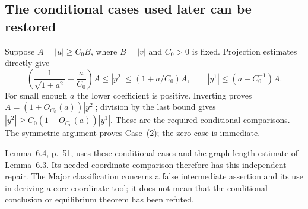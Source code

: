 \documentclass[10pt]{article}
\begin{document}
\subsection*{The conditional cases used later can be restored}
Suppose \(A=|u|\ge C_0B\), where \(B=|v|\) and \(C_0>0\) is fixed. Projection estimates directly give \[\left(\frac1{\sqrt{1+a^2}}-\frac a{C_0}\right)A
 \le |y^2|\le(1+a/C_0)A,\qquad
 |y^1|\le(a+C_0^{-1})A .\] For small enough \(a\) the lower coefficient is positive. Inverting proves \(A=(1+O_{C_0}(a))|y^2|\); division by the last bound gives \(|y^2|\ge C_0(1-O_{C_0}(a))|y^1|\). These are the required conditional comparisons. The symmetric argument proves Case (2); the zero case is immediate.\par
Lemma 6.4, p. 51, uses these conditional cases and the graph length estimate of Lemma 6.3. Its needed coordinate comparison therefore has this independent repair. The Major classification concerns a false intermediate assertion and its use in deriving a core coordinate tool; it does not mean that the conditional conclusion or equilibrium theorem has been refuted.\par
\end{document}
